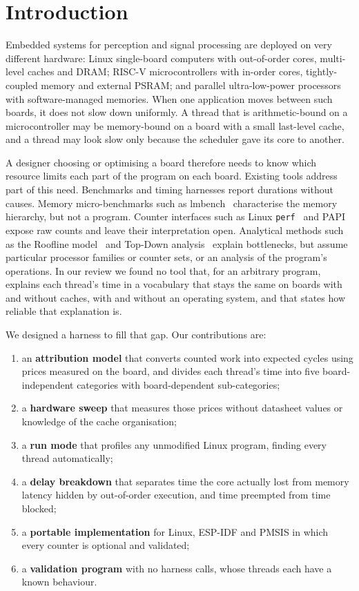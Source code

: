 \documentclass[10pt,a4paper,twocolumn]{article}
\newcommand{\code}[1]{\texttt{\small #1}}
\begin{document}
\section{Introduction}

Embedded systems for perception and signal processing are deployed on very different hardware: Linux single-board computers with out-of-order cores, multi-level caches and DRAM; RISC-V microcontrollers with in-order cores, tightly-coupled memory and external PSRAM; and parallel ultra-low-power processors with software-managed memories. When one application moves between such boards, it does not slow down uniformly. A thread that is arithmetic-bound on a microcontroller may be memory-bound on a board with a small last-level cache, and a thread may look slow only because the scheduler gave its core to another.

A designer choosing or optimising a board therefore needs to know which resource limits each part of the program on each board. Existing tools address part of this need. Benchmarks and timing harnesses report durations without causes. Memory micro-benchmarks such as lmbench~\cite{lmbench} characterise the memory hierarchy, but not a program. Counter interfaces such as Linux \code{perf}~\cite{perfman} and PAPI~\cite{papi} expose raw counts and leave their interpretation open. Analytical methods such as the Roofline model~\cite{roofline} and Top-Down analysis~\cite{topdown} explain bottlenecks, but assume particular processor families or counter sets, or an analysis of the program's operations. In our review we found no tool that, for an arbitrary program, explains each thread's time in a vocabulary that stays the same on boards with and without caches, with and without an operating system, and that states how reliable that explanation is.

We designed a harness to fill that gap. Our contributions are:
\begin{enumerate}
  \item an \textbf{attribution model} that converts counted work into expected cycles using prices measured on the board, and divides each thread's time into five board-independent categories with board-dependent sub-categories;
  \item a \textbf{hardware sweep} that measures those prices without datasheet values or knowledge of the cache organisation;
  \item a \textbf{run mode} that profiles any unmodified Linux program, finding every thread automatically;
  \item a \textbf{delay breakdown} that separates time the core actually lost from memory latency hidden by out-of-order execution, and time preempted from time blocked;
  \item a \textbf{portable implementation} for Linux, ESP-IDF and PMSIS in which every counter is optional and validated;
  \item a \textbf{validation program} with no harness calls, whose threads each have a known behaviour.
\end{enumerate}
\end{document}

